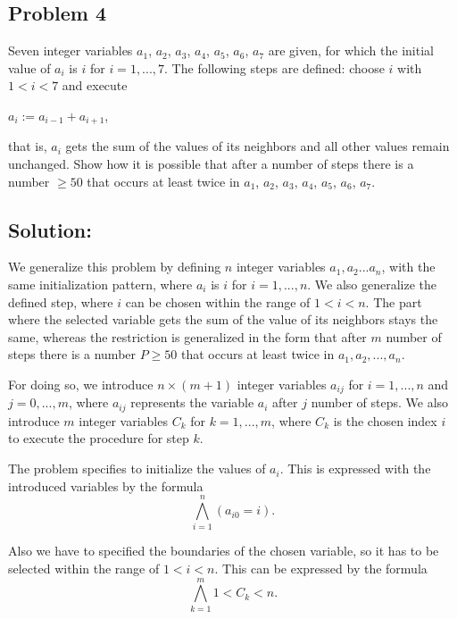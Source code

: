 \subsection*{Problem 4}

Seven integer variables $a_{1}$, $a_{2}$, $a_{3}$, $a_{4}$, $a_{5}$, $a_{6}$, $a_{7}$ are given, for which the initial value of $a_{i}$ is $i$ for $i = 1, . . . , 7$. The following steps are defined: choose $i$ with $1 < i < 7$ and execute
\begin{center}
$a_{i} := a_{i−1} + a_{i+1}$,\\
\end{center}
that is, $a_{i}$ gets the sum of the values of its neighbors and all other values remain unchanged. Show how it is possible that after a number of steps there is a number $\geq 50$ that occurs at least twice in $a_{1}$, $a_{2}$, $a_{3}$, $a_{4}$, $a_{5}$, $a_{6}$, $a_{7}$.
\vspace{4mm}

\subsection*{Solution:}

We generalize this problem by defining $n$ integer variables $a_{1}, a_{2} . . . a_{n}$, with the same initialization pattern, where $a_{i}$ is $i$ for $i = 1, . . . , n$. We also generalize the defined step, where $i$ can be chosen within the range of $1 < i < n$. The part where the selected variable gets the sum of the value of its neighbors stays the same, whereas the restriction is generalized in the form that after $m$ number of steps there is a number $ P \geq 50$ that occurs at least twice in $a_{1}, a_{2}, . . . , a_{n}$.

For doing so, we introduce $n\times (m+1)$ integer variables $a_{ij}$ for $i = 1, . . . , n$ and $j = 0, . . . , m$, where $a_{ij}$ represents the variable $a_{i}$ after $j$ number of steps. We also introduce $m$ integer variables $C_k$ for $k = 1, . . . , m$, where $C_k$ is the chosen index $i$ to execute the procedure for step $k$.

The problem specifies to initialize the values of $a_i$. This is expressed with the introduced variables by the formula
\[ \bigwedge_{i=1}^n (a_{i0} = i).\]

Also we have to specified the boundaries of the chosen variable, so it has to be selected within the range of $1 < i < n$. This can be expressed by the formula
\[ \bigwedge_{k=1}^m 1<C_k<n.\]

